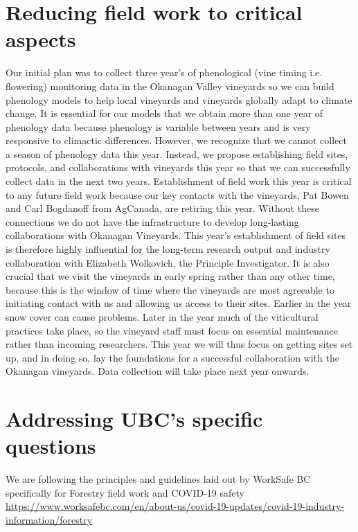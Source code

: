\documentclass[11pt,letter]{article}
\begin{document}
\section{Reducing field work to critical aspects}
Our initial plan was to collect three year's of phenological (vine timing i.e. flowering) monitoring data in the Okanagan Valley vineyards so we can build phenology models to help local vineyards and vineyards globally adapt to climate change. It is essential for our models that we obtain more than one year of phenology data because phenology is variable between years and is very responsive to climactic differences. However, we recognize that we cannot collect a season of phenology data this year. Instead, we propose establishing field sites, protocols, and collaborations with vineyards this year so that we can successfully collect data in the next two years. Establishment of field work this year is critical to any future field work because our key contacts with the vineyards, Pat Bowen and Carl Bogdanoff from AgCanada, are retiring this year. Without these connections we do not have the infrastructure to develop long-lasting collaborations with Okanagan Vineyards. This year's establishment of field sites is therefore highly influential for the long-term research output and industry collaboration with Elizabeth Wolkovich, the Principle Investigator. It is also crucial that we visit the vineyards in early spring rather than any other time, because this is the window of time where the vineyards are most agreeable to initiating contact with us and allowing us access to their sites. Earlier in the year snow cover can cause problems. Later in the year much of the viticultural practices take place, so the vineyard staff must focus on essential maintenance rather than incoming researchers. This year we will thus focus on getting sites set up, and in doing so, lay the foundations for a successful collaboration with the Okanagan vineyards. Data collection will take place next year onwards.

\section{Addressing UBC's specific questions}
We are following the principles and guidelines laid out by WorkSafe BC specifically for Forestry field work and COVID-19 safety \url{https://www.worksafebc.com/en/about-us/covid-19-updates/covid-19-industry-information/forestry} \\
\end{document}
